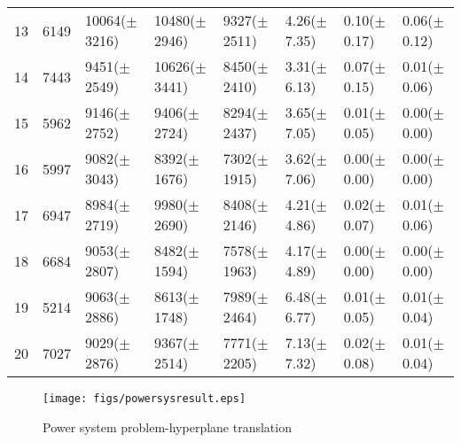 \documentclass[review]{elsarticle}
\begin{document}
\begin{table*}[t!]
{\begin{tabular}{l|c|l|l|l|l|l|l}
13   & 6149                   & 10064($\pm$3216) & 10480($\pm$2946)    & 9327($\pm$2511)  & 4.26($\pm$7.35)   & 0.10($\pm$0.17)     & 0.06($\pm$0.12)     \\
14   & 7443                  & 9451($\pm$2549) & 10626($\pm$3441)    & 8450($\pm$2410)  & 3.31($\pm$6.13)   & 0.07($\pm$0.15)     & 0.01($\pm$0.06)   \\
15   & 5962              & 9146($\pm$2752) & 9406($\pm$2724)    & 8294($\pm$2437)  & 3.65($\pm$7.05)   & 0.01($\pm$0.05)    & 0.00($\pm$0.00)   \\
16   & 5997                  & 9082($\pm$3043) & 8392($\pm$1676)    & 7302($\pm$1915)  & 3.62($\pm$7.06)   & 0.00($\pm$0.00)           & 0.00($\pm$0.00)          \\
17   & 6947                    & 8984($\pm$2719) & 9980($\pm$2690)    & 8408($\pm$2146)    & 4.21($\pm$4.86)    & 0.02($\pm$0.07)    & 0.01($\pm$0.06)   \\
18   & 6684                  & 9053($\pm$2807) & 8482($\pm$1594)      & 7578($\pm$1963)  & 4.17($\pm$4.89)   & 0.00($\pm$0.00)    & 0.00($\pm$0.00)          \\
19   & 5214                    & 9063($\pm$2886) & 8613($\pm$1748)    & 7989($\pm$2464)  & 6.48($\pm$6.77)   & 0.01($\pm$0.05)    & 0.01($\pm$0.04)   \\
20   & 7027                    & 9029($\pm$2876) & 9367($\pm$2514)    & 7771($\pm$2205)  & 7.13($\pm$7.32)   & 0.02($\pm$0.08)    & 0.01($\pm$0.04)  
\end{tabular}
}
\end{table*}
 \begin{figure*}[t!]
        \centering          \texttt{[image: figs/powersysresult.eps]} 
        \caption[]
        {\small Power system problem-hyperplane translation}
         \label{fig:posysresult}
    \end{figure*}
\end{document}
